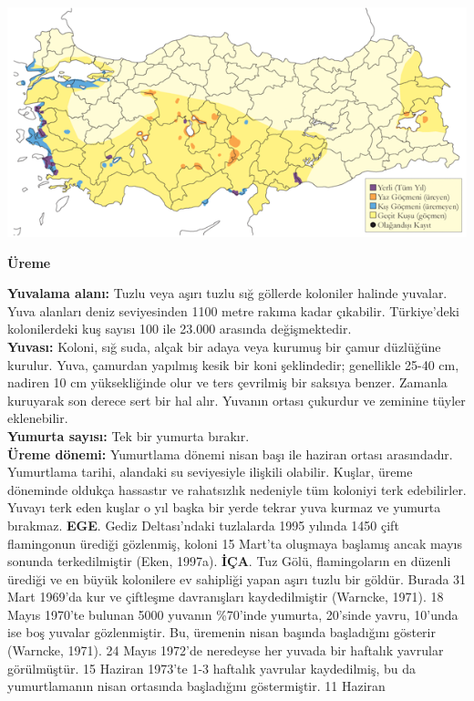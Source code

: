 \documentclass[
  a4paper,
  DIV=11,
  numbers=noendperiod]{scrreprt}
\begin{document}
\includegraphics{images/harita_Page_056.png}

\textbf{Üreme}

\textbf{Yuvalama alanı:} Tuzlu veya aşırı tuzlu sığ göllerde koloniler
halinde yuvalar. Yuva alanları deniz seviyesinden 1100 metre rakıma
kadar çıkabilir. Türkiye'deki kolonilerdeki kuş sayısı 100 ile 23.000
arasında değişmektedir.\\
\textbf{Yuvası:} Koloni, sığ suda, alçak bir adaya veya kurumuş bir
çamur düzlüğüne kurulur. Yuva, çamurdan yapılmış kesik bir koni
şeklindedir; genellikle 25-40 cm, nadiren 10 cm yüksekliğinde olur ve
ters çevrilmiş bir saksıya benzer. Zamanla kuruyarak son derece sert bir
hal alır. Yuvanın ortası çukurdur ve zeminine tüyler eklenebilir.\\
\textbf{Yumurta sayısı:} Tek bir yumurta bırakır.\\
\textbf{Üreme dönemi:} Yumurtlama dönemi nisan başı ile haziran ortası
arasındadır. Yumurtlama tarihi, alandaki su seviyesiyle ilişkili
olabilir. Kuşlar, üreme döneminde oldukça hassastır ve rahatsızlık
nedeniyle tüm koloniyi terk edebilirler. Yuvayı terk eden kuşlar o yıl
başka bir yerde tekrar yuva kurmaz ve yumurta bırakmaz. \textbf{EGE}.
Gediz Deltası'ndaki tuzlalarda 1995 yılında 1450 çift flamingonun
ürediği gözlenmiş, koloni 15 Mart'ta oluşmaya başlamış ancak mayıs
sonunda terkedilmiştir (Eken, 1997a). \textbf{İÇA}. Tuz Gölü,
flamingoların en düzenli ürediği ve en büyük kolonilere ev sahipliği
yapan aşırı tuzlu bir göldür. Burada 31 Mart 1969'da kur ve çiftleşme
davranışları kaydedilmiştir (Warncke, 1971). 18 Mayıs 1970'te bulunan
5000 yuvanın \%70'inde yumurta, 20'sinde yavru, 10'unda ise boş yuvalar
gözlenmiştir. Bu, üremenin nisan başında başladığını gösterir (Warncke,
1971). 24 Mayıs 1972'de neredeyse her yuvada bir haftalık yavrular
görülmüştür. 15 Haziran 1973'te 1-3 haftalık yavrular kaydedilmiş, bu da
yumurtlamanın nisan ortasında başladığını göstermiştir. 11 Haziran
\end{document}
